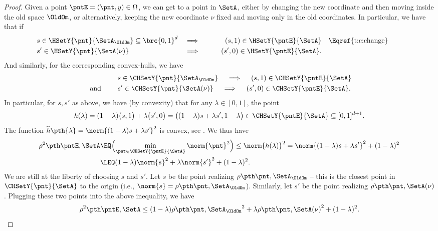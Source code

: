 \begin{proof}
    Given a point $\pntE = (\pnt,y) \in \Omega$, we can get to a point
    in $\SetA$, either by changing the new coordinate and then moving
    inside the old space $\OldOm$, or alternatively, keeping the new
    coordinate $\nu$ fixed and moving only in the old coordinates. In
    particular, we have that if
    \smallskip%
    \begin{align*}
        &s \in \HSetY{\pnt}{\SetA_\OldOm} \subseteq \brc{0,1}^d
        &\implies&& \quad(s,1) \in \HSetY{\pntE}{\SetA}
        &\quad\text{\Eqref{t:c:change}}\qquad \\%
        &s' \in \HSetY{\pnt}{\SetA(\nu)} & \implies&& \qquad(s',0) \in
        \HSetY{\pntE}{\SetA}.
    \end{align*}
    And similarly, for the corresponding convex-hulls, we have
    \begin{align*}
        &s \in \CHSetY{\pnt}{\SetA_\OldOm} 
        \quad\implies\quad 
        (s,1) \in \CHSetY{\pntE}{\SetA}
        \\
       \text{ and }\qquad%
        &
        s' \in \CHSetY{\pnt}{\SetA(\nu)}
        \quad\implies\quad
        (s',0) \in \CHSetY{\pntE}{\SetA}.
    \end{align*}
    In particular, for $s, s'$ as above, we have (by convexity) that for
    any $\lambda \in [0,1]$, the point
    \begin{equation*}
        h(\lambda)%
        =%
        (1-\lambda)\bigl(s,1\bigr) + \lambda \bigl(s',0\bigr)%
        =%
        \bigl( (1-\lambda)s + \lambda s', 1-\lambda \bigr)
        \in%
        \CHSetY{\pntE}{\SetA}%
        \subseteq%
        [0,1]^{d+1}.
    \end{equation*}
    The function
    \begin{math}
        \widehat{h}\pth{\lambda} = \norm{ (1-\lambda)s + \lambda s'}^2
    \end{math}    
    is convex, see . We thus have
    \begin{align*}
        \distTSqY{\pntE}{\SetA}%
        &\EQ
        \Bigl(
        \min_{\pnt \in \CHSetY{\pntE}{\SetA}} \norm{\pnt}^2
        \Bigr)
        \leq%
        \norm{h(\lambda)}^2 %
        =%
        \norm{ (1-\lambda)s + \lambda s'}^2 + ( 1-\lambda)^2        
        \\&
        \LEQ%
        (1-\lambda)\norm{s}^2  + \lambda \norm{ s'}^2 + ( 1-\lambda)^2.
    \end{align*}
    We are still at the liberty of choosing $s$ and $s'$. Let $s$ be
    the point realizing $\distTY{\pnt}{\SetA_\OldOm}$ -- this is the
    closest point in $\CHSetY{\pnt}{\SetA}$ to the origin (i.e.,
    $\norm{s} = \distTY{\pnt}{\SetA_\OldOm}$). Similarly, let $s'$ be
    the point realizing $\distTY{\pnt}{\SetA(\nu)}$. Plugging these
    two points into the above inequality, we have
    \begin{equation*}
        \distTSqY{\pntE}{\SetA}%
        \leq%
        (1-\lambda)\distTY{\pnt}{\SetA_\OldOm}^2
        + \lambda \distTY{\pnt}{\SetA(\nu)}^2 + ( 1-\lambda)^2.
    \end{equation*}


\end{proof}
